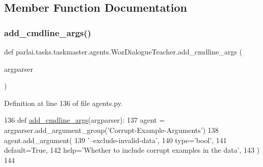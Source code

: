 \subsection{Member Function Documentation}
\mbox{\label{classparlai_1_1tasks_1_1taskmaster_1_1agents_1_1WozDialogueTeacher_a4af3fe28fd0b7558ddf7ed93c311c722}} 
\subsubsection{\texorpdfstring{add\+\_\+cmdline\+\_\+args()}{add\_cmdline\_args()}}
{\footnotesize\ttfamily def parlai.\+tasks.\+taskmaster.\+agents.\+Woz\+Dialogue\+Teacher.\+add\+\_\+cmdline\+\_\+args (\begin{DoxyParamCaption}\item[{}]{argparser }\end{DoxyParamCaption})\hspace{0.3cm}{\ttfamily [static]}}



Definition at line 136 of file agents.\+py.


\begin{DoxyCode}
136     \textcolor{keyword}{def }\hyperlink{namespaceparlai_1_1agents_1_1drqa_1_1config_a62fdd5554f1da6be0cba185271058320}{add\_cmdline\_args}(argparser):
137         agent = argparser.add\_argument\_group(\textcolor{stringliteral}{'Corrupt-Example-Arguments'})
138         agent.add\_argument(
139             \textcolor{stringliteral}{'--exclude-invalid-data'},
140             type=\textcolor{stringliteral}{'bool'},
141             default=\textcolor{keyword}{True},
142             help=\textcolor{stringliteral}{'Whether to include corrupt examples in the data'},
143         )
144 
\end{DoxyCode}
\mbox{\label{classparlai_1_1tasks_1_1taskmaster_1_1agents_1_1WozDialogueTeacher_a982f56ed9a06f08ecf0c5392f0cb9c0b}} 
